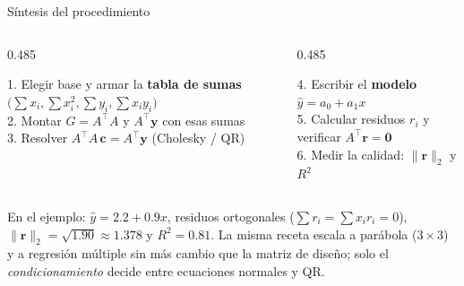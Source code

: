 \documentclass[aspectratio=169,10pt]{beamer}
\begin{document}
\begin{frame}{Síntesis del procedimiento}
\vspace{1mm}
\begin{columns}[T]
\begin{column}{0.485\textwidth}
\begin{cardlista}
1.\; Elegir base y armar la \textbf{tabla de sumas} $\big(\sum x_i,\sum x_i^2,\sum y_i,\sum x_iy_i\big)$\\[0.6mm]
2.\; Montar $G=A^{\!\top}\!A$ y $A^{\!\top}\mathbf y$ con esas sumas\\[0.6mm]
3.\; Resolver $A^{\!\top}\!A\,\mathbf c=A^{\!\top}\mathbf y$ (Cholesky / QR)
\end{cardlista}
\end{column}
\begin{column}{0.485\textwidth}
\begin{cardlista}
4.\; Escribir el \textbf{modelo} $\hat y=a_0+a_1x$\\[0.6mm]
5.\; Calcular residuos $r_i$ y verificar $A^{\!\top}\mathbf r=\mathbf 0$\\[0.6mm]
6.\; Medir la calidad: $\|\mathbf r\|_2$ y $R^2$
\end{cardlista}
\end{column}
\end{columns}
\vspace{2mm}
\begin{cardnota}[\faInfoCircle]
En el ejemplo: $\hat y=2.2+0.9x$, residuos ortogonales ($\sum r_i=\sum x_ir_i=0$), $\|\mathbf r\|_2=\sqrt{1.90}\approx1.378$ y $R^2=0.81$. La misma receta escala a parábola ($3\times3$) y a regresión múltiple sin más cambio que la matriz de diseño; solo el \emph{condicionamiento} decide entre ecuaciones normales y QR.
\end{cardnota}
\end{frame}
\end{document}
